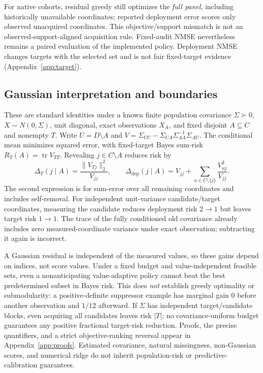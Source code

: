 \documentclass{article}
\newcommand{\tr}{\operatorname{tr}}
\begin{document}
For native cohorts, residual greedy still optimizes the \emph{full panel}, including historically unavailable coordinates; reported deployment error scores only observed unacquired coordinates. This objective/support mismatch is not an observed-support-aligned acquisition rule. Fixed-audit NMSE nevertheless remains a paired evaluation of the implemented policy. Deployment NMSE changes targets with the selected set and is not fair fixed-target evidence (Appendix~\ref{app:target}).

\subsection{Gaussian interpretation and boundaries}\label{sec:theory}
These are standard identities under a known finite population covariance $\Sigma\succ0$, $X\sim N(0,\Sigma)$, unit diagonal, exact observations $X_A$, and fixed disjoint $A\subseteq C$ and nonempty $T$. Write $U=D\setminus A$ and $V=\Sigma_{UU}-\Sigma_{UA}\Sigma_{AA}^{-1}\Sigma_{AU}$. The conditional mean minimizes squared error, with fixed-target Bayes sum-risk $R_T(A)=\tr V_{TT}$. Revealing $j\in C\setminus A$ reduces risk by
\begin{equation}
 \Delta_T(j\mid A)=\frac{\|V_{Tj}\|_2^2}{V_{jj}},\qquad
 \Delta_{\mathrm{dep}}(j\mid A)=V_{jj}+\sum_{u\in U\setminus\{j\}}\frac{V_{uj}^2}{V_{jj}}.
 \label{eq:gains}
\end{equation}
The second expression is for sum-error over all remaining coordinates and includes self-removal. For independent unit-variance candidate/target coordinates, measuring the candidate reduces deployment risk $2\to1$ but leaves target risk $1\to1$. The trace of the fully conditioned old covariance already includes zero measured-coordinate variance under exact observation; subtracting it again is incorrect.

A Gaussian residual is independent of the measured values, so these gains depend on indices, not score values. Under a fixed budget and value-independent feasible sets, even a nonanticipating value-adaptive policy cannot beat the best predetermined subset in Bayes risk. This does \emph{not} establish greedy optimality or submodularity: a positive-definite suppressor example has marginal gain $0$ before another observation and $1/12$ afterward. If $\Sigma$ has independent target/candidate blocks, even acquiring all candidates leaves risk $|T|$; no covariance-uniform budget guarantees any positive fractional target-risk reduction. Proofs, the precise quantifiers, and a strict objective-ranking reversal appear in Appendix~\ref{app:proofs}. Estimated covariance, natural missingness, non-Gaussian scores, and numerical ridge do not inherit population-risk or predictive-calibration guarantees.
\end{document}
